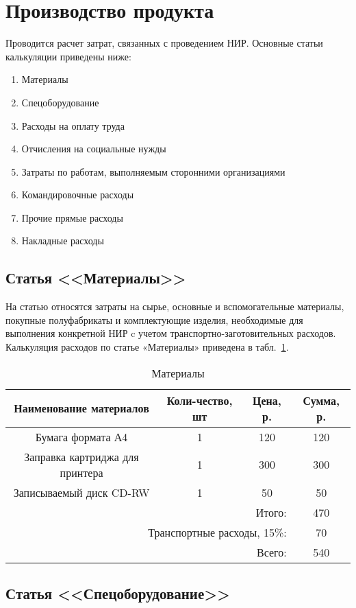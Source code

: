 \section{Производство продукта}

Проводится расчет затрат, связанных с проведением НИР. Основные статьи калькуляции приведены ниже:
\begin{enumerate}
\item Материалы
\item Спецоборудование
\item Расходы на оплату труда
\item Отчисления на социальные нужды
\item Затраты по работам, выполняемым сторонними организациями
\item Командировочные расходы
\item Прочие прямые расходы
\item Накладные расходы
\end{enumerate}

\subsection{Статья <<Материалы>>}

На статью относятся затраты на сырье, основные и вспомогательные материалы, покупные  полуфабрикаты
и комплектующие изделия, необходимые для выполнения конкретной НИР c учетом транспортно-заготовительных
расходов. Калькуляция расходов по статье «Материалы» приведена в табл.~\ref{tab:material}.

\begin{table}[ht]
\caption{Материалы}
\begin{tabular}{|c|c|c|c|}
\hline
Наименование материалов&Коли-чество, шт&Цена, р.&Сумма, р.\\
\hline
Бумага формата А4&1&120&120\\
\hline
Заправка картриджа для принтера&1&300&300\\
\hline
Записываемый диск CD-RW&1&50&50\\
\hline
\multicolumn{3}{|r|}{Итого:}&470\\
\hline
\multicolumn{3}{|r|}{Транспортные расходы, 15\%:}&70\\
\hline
\multicolumn{3}{|r|}{Всего:}&540\\
\hline
\end{tabular}
\label{tab:material}
\end{table}

\subsection{Статья <<Спецоборудование>>}

